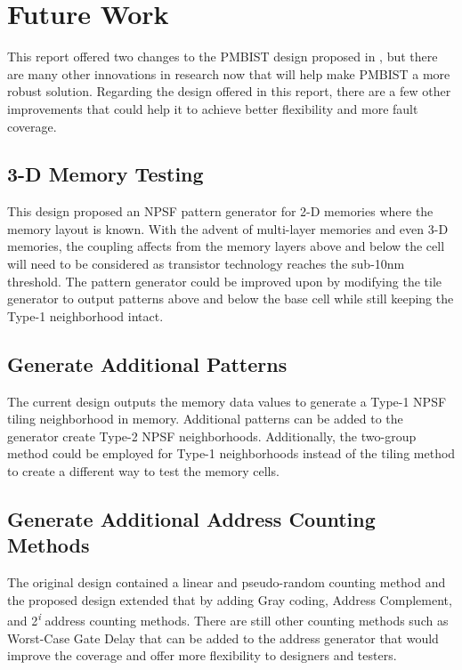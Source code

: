 \section{Future Work}
\label{sect:bg-future}
This report offered two changes to the PMBIST design proposed in \cite{3}, but there are many other innovations in research now that will help make PMBIST a more robust solution.  Regarding the design offered in this report, there are a few other improvements that could help it to achieve better flexibility and more fault coverage.

\subsection{3-D Memory Testing}
This design proposed an NPSF pattern generator for 2-D memories where the memory layout is known.  With the advent of multi-layer memories and even 3-D memories, the coupling affects from the memory layers above and below the cell will need to be considered as transistor technology reaches the sub-10nm threshold.  The pattern generator could be improved upon by modifying the tile generator to output patterns above and below the base cell while still keeping the Type-1 neighborhood intact.

\subsection{Generate Additional Patterns}
The current design outputs the memory data values to generate a Type-1 NPSF tiling neighborhood in memory.  Additional patterns can be added to the generator create Type-2 NPSF neighborhoods.  Additionally, the two-group method could be employed for Type-1 neighborhoods instead of the tiling method to create a different way to test the memory cells.

\subsection{Generate Additional Address Counting Methods}
The original design contained a linear and pseudo-random counting method and the proposed design extended that by adding Gray coding, Address Complement, and 2\textsuperscript{\textit{i}} address counting methods.  There are still other counting methods such as Worst-Case Gate Delay that can be added to the address generator that would improve the coverage and offer more flexibility to designers and testers.  
